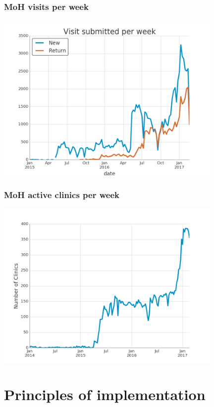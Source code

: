 \documentclass{beamer}
\begin{document}
\begin{frame}
  \frametitle{MoH visits per week}
  \begin{center}
    \includegraphics[width=11cm]{visit_week.png}
  \end{center}
\end{frame}
\begin{frame}
  \frametitle{MoH active clinics per week}
  \begin{center}
    \includegraphics[width=11cm]{active.png}
  \end{center}
\end{frame}



\section{Principles of implementation}
\end{document}
